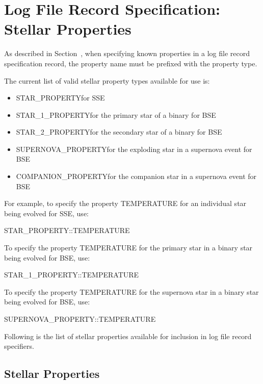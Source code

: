 \section{Log File Record Specification: Stellar Properties}\label{sec:LogFileRecord_Stellar}

As described in Section~, when specifying known properties in a log file record specification record, the property name must be prefixed with the property type.

The current list of valid stellar property types available for use is:

\begin{itemize}
    \item{STAR\_PROPERTY\tabto{12em}for SSE}
    \item{STAR\_1\_PROPERTY\tabto{12em}for the primary star of a binary for BSE}
    \item{STAR\_2\_PROPERTY\tabto{12em}for the secondary star of a binary for BSE}
    \item{SUPERNOVA\_PROPERTY\tabto{12em}for the exploding star in a supernova event for BSE}
    \item{COMPANION\_PROPERTY\tabto{12em}for the companion star in a supernova event for BSE}
\end{itemize}

For example, to specify the property TEMPERATURE for an individual star being evolved for SSE, use:

\tabto{3em}STAR\_PROPERTY::TEMPERATURE

To specify the property TEMPERATURE for the primary star in a binary star being evolved for BSE, use:

\tabto{3em}STAR\_1\_PROPERTY::TEMPERATURE

To specify the property TEMPERATURE for the supernova star in a binary star being evolved for BSE, use:

\tabto{3em}SUPERNOVA\_PROPERTY::TEMPERATURE

Following is the list of stellar properties available for inclusion in log file record specifiers.

\subsection{Stellar Properties}\label{sec:StellarProperties}


